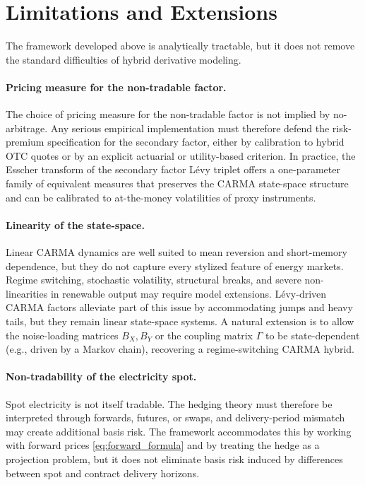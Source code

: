 \documentclass[10pt,reqno]{amsart}
\newcommand{\1}{\mathbbm{1}}
\begin{document}


\section{Limitations and Extensions}\label{sec:limitations}

The framework developed above is analytically tractable, but it does not remove
the standard difficulties of hybrid derivative modeling.

\paragraph{Pricing measure for the non-tradable factor.}
The choice of pricing measure for the non-tradable factor is not implied
by no-arbitrage. Any serious empirical implementation must therefore defend the
risk-premium specification for the secondary factor, either by calibration to
hybrid OTC quotes or by an explicit actuarial or utility-based criterion.
In practice, the Esscher transform of the secondary factor Lévy triplet offers a
one-parameter family of equivalent measures that preserves the CARMA state-space
structure and can be calibrated to at-the-money volatilities of proxy instruments.

\paragraph{Linearity of the state-space.}
Linear CARMA dynamics are well suited to mean reversion and short-memory
dependence, but they do not capture every stylized feature of energy markets.
Regime switching, stochastic volatility, structural breaks, and severe
non-linearities in renewable output may require model extensions. Lévy-driven
CARMA factors alleviate part of this issue by accommodating jumps and heavy
tails, but they remain linear state-space systems. A natural extension is to
allow the noise-loading matrices $B_X, B_Y$ or the coupling matrix
$\Gamma$ to be state-dependent (e.g., driven by a Markov chain), recovering
a regime-switching CARMA hybrid.

\paragraph{Non-tradability of the electricity spot.}
Spot electricity is not itself tradable. The hedging theory must therefore be
interpreted through forwards, futures, or swaps, and delivery-period mismatch
may create additional basis risk. The framework accommodates this by working
with forward prices \eqref{eq:forward_formula} and by treating the hedge as a
projection problem, but it does not eliminate basis risk induced by differences
between spot and contract delivery horizons.
\end{document}

